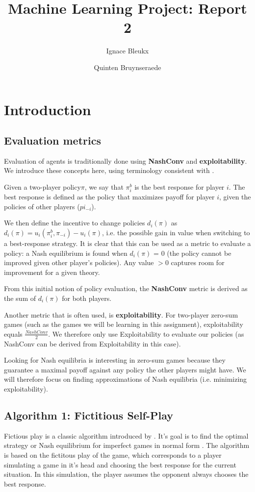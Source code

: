 \documentclass[10pt,a4paper]{article}
\title{Machine Learning Project: Report 2}
\author{Ignace Bleukx \and Quinten Bruynseraede}
\begin{document}
\maketitle
\section{Introduction}
\subsection{Evaluation metrics}
Evaluation of agents is traditionally done using \textbf{NashConv} and \textbf{exploitability}. We introduce these concepts here, using terminology consistent with \citeauthor{lanctot2019openspiel} \citep{lanctot2019openspiel}.

Given a two-player policy$\pi$, we say that $\pi^{b}_{i}$ is the best response for player $i$. The best response is defined as the policy that maximizes payoff for player $i$, given the policies of other players ($pi_{-i}$). 

We then define the incentive to change policies $d_{i}(\pi)$ as $d_{i}(\pi) = u_{i}(\pi^{b}_{i},\pi_{-i}) - u_{i}(\pi)$, i.e. the possible gain in value when switching to a best-response strategy. It is clear that this can be used as a metric to evaluate a policy: a Nash equilibrium is found when $d_{i}(\pi)$ = 0 (the policy cannot be improved given other player's policies). Any value $>0$ captures room for improvement for a given theory. 

From this initial notion of policy evaluation, the \textbf{NashConv} metric is derived as the sum of $d_{i}(\pi)$ for both players.

Another metric that is often used, is \textbf{exploitability}. For two-player zero-sum games (such as the games we will be learning in this assignment), exploitability equals $\frac{NashConv}{2}$. We therefore only use Exploitability to evaluate our policies (as NashConv can be derived from Exploitability in this case).

Looking for Nash equilibria is interesting in zero-sum games because they guarantee a maximal payoff against any policy the other players might have. We will therefore focus on finding approximations of Nash equilibria (i.e. minimizing exploitability). 

\subsection{Algorithm 1: Fictitious Self-Play}
Fictious play is a classic algorithm introduced by \cite{fp}. It's goal is to find the optimal strategy or Nash equilibrium for imperfect games in normal form \cite{MCFSP}. The algorithm is based on the fictitous play of the game, which corresponds to a player simulating a game in it's head and choosing the best response for the current situation. In this simulation, the player assumes the opponent always chooses the best response.
\end{document}
